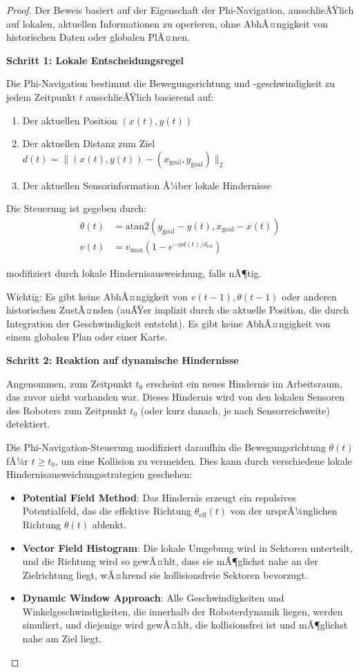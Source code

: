 ﻿\documentclass[a4paper,12pt]{article}
\theoremstyle{definition}
\begin{document}
\begin{proof}
Der Beweis basiert auf der Eigenschaft der Phi-Navigation, ausschlieÃŸlich auf lokalen, aktuellen Informationen zu operieren, ohne AbhÃ¤ngigkeit von historischen Daten oder globalen PlÃ¤nen.

\textbf{Schritt 1: Lokale Entscheidungsregel}

Die Phi-Navigation bestimmt die Bewegungsrichtung und -geschwindigkeit zu jedem Zeitpunkt $t$ ausschlieÃŸlich basierend auf:
\begin{enumerate}
\item Der aktuellen Position $(x(t), y(t))$
\item Der aktuellen Distanz zum Ziel $d(t) = \|(x(t), y(t)) - (x_{\text{goal}}, y_{\text{goal}})\|_2$
\item Der aktuellen Sensorinformation Ã¼ber lokale Hindernisse
\end{enumerate}

Die Steuerung ist gegeben durch:
\begin{align}
\theta(t) &= \text{atan2}(y_{\text{goal}} - y(t), x_{\text{goal}} - x(t)) \\
v(t) &= v_{\max}(1 - e^{-\phi d(t)/d_{\text{ref}}})
\end{align}

modifiziert durch lokale Hindernisausweichung, falls nÃ¶tig.

Wichtig: Es gibt keine AbhÃ¤ngigkeit von $v(t-1), \theta(t-1)$ oder anderen historischen ZustÃ¤nden (auÃŸer implizit durch die aktuelle Position, die durch Integration der Geschwindigkeit entsteht). Es gibt keine AbhÃ¤ngigkeit von einem globalen Plan oder einer Karte.

\textbf{Schritt 2: Reaktion auf dynamische Hindernisse}

Angenommen, zum Zeitpunkt $t_0$ erscheint ein neues Hindernis im Arbeitsraum, das zuvor nicht vorhanden war. Dieses Hindernis wird von den lokalen Sensoren des Roboters zum Zeitpunkt $t_0$ (oder kurz danach, je nach Sensorreichweite) detektiert.

Die Phi-Navigation-Steuerung modifiziert daraufhin die Bewegungsrichtung $\theta(t)$ fÃ¼r $t \geq t_0$, um eine Kollision zu vermeiden. Dies kann durch verschiedene lokale Hindernisausweichungsstrategien geschehen:
\begin{itemize}
\item \textbf{Potential Field Method}: Das Hindernis erzeugt ein repulsives Potentialfeld, das die effektive Richtung $\theta_{\text{eff}}(t)$ von der ursprÃ¼nglichen Richtung $\theta(t)$ ablenkt.
\item \textbf{Vector Field Histogram}: Die lokale Umgebung wird in Sektoren unterteilt, und die Richtung wird so gewÃ¤hlt, dass sie mÃ¶glichst nahe an der Zielrichtung liegt, wÃ¤hrend sie kollisionsfreie Sektoren bevorzugt.
\item \textbf{Dynamic Window Approach}: Alle Geschwindigkeiten und Winkelgeschwindigkeiten, die innerhalb der Roboterdynamik liegen, werden simuliert, und diejenige wird gewÃ¤hlt, die kollisionsfrei ist und mÃ¶glichst nahe am Ziel liegt.
\end{itemize}


\end{proof}
\end{document}
